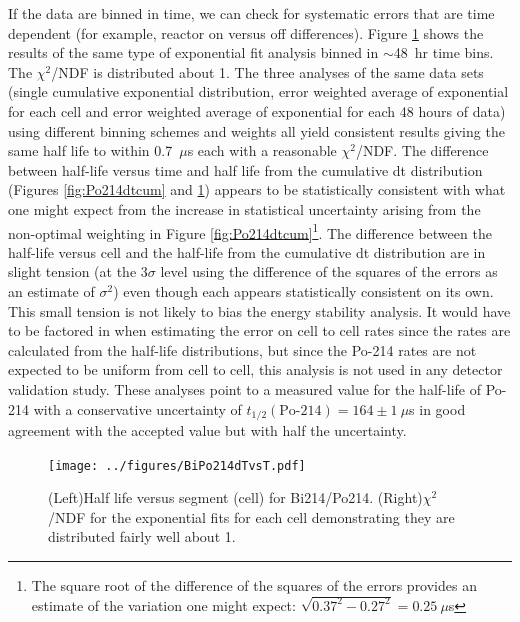 If the data are binned in time, we can check for systematic errors that are time dependent (for example, reactor on versus off differences). Figure \ref{fig:Po214thalfvstime} shows the results of the same type of exponential fit analysis binned in $\sim$48~hr time bins. The $\chi^2$/NDF is distributed about 1. The three analyses of the same data sets (single cumulative exponential distribution, error weighted average of exponential for each cell and error weighted average of exponential for each 48 hours of data) using different binning schemes and weights all yield consistent results giving the same half life to within 0.7~$\mu$s each with a reasonable $\chi^2$/NDF. The difference between half-life versus time and half life from the cumulative dt distribution (Figures \ref{fig:Po214dtcum} and \ref{fig:Po214thalfvstime}) appears to be statistically consistent with what one might expect from the increase in statistical uncertainty arising from the non-optimal weighting in Figure \ref{fig:Po214dtcum}\footnote{The square root of the difference of the squares of the errors provides an estimate of the variation one might expect: $\sqrt{0.37^2-0.27^2}=0.25~\mu$s}. The difference between the half-life versus cell and the half-life from the cumulative dt distribution are in slight tension (at the 3$\sigma$ level using the difference of the squares of the errors as an estimate of $\sigma^2$) even though each appears statistically consistent on its own. This small tension is not likely to bias the energy stability analysis. It would have to be factored in when estimating the error on cell to cell rates since the rates are calculated from the half-life distributions, but since the Po-214 rates are not expected to be uniform from cell to cell, this analysis is not used in any detector validation study. These analyses point to a measured value for the half-life of Po-214 with a conservative uncertainty of $t_{1/2}(\textrm{Po-214})=164\pm1~\mu$s in good agreement with the accepted value but with half the uncertainty.  
\begin{figure}[!h]
	\centering
	\texttt{[image: ../figures/BiPo214dTvsT.pdf]}
	\caption{\label{fig:Po214thalfvstime}(Left)Half life versus segment (cell) for Bi214/Po214. (Right)$\chi^2$/NDF for the exponential fits for each cell demonstrating they are distributed fairly well about 1.}
\end{figure}

